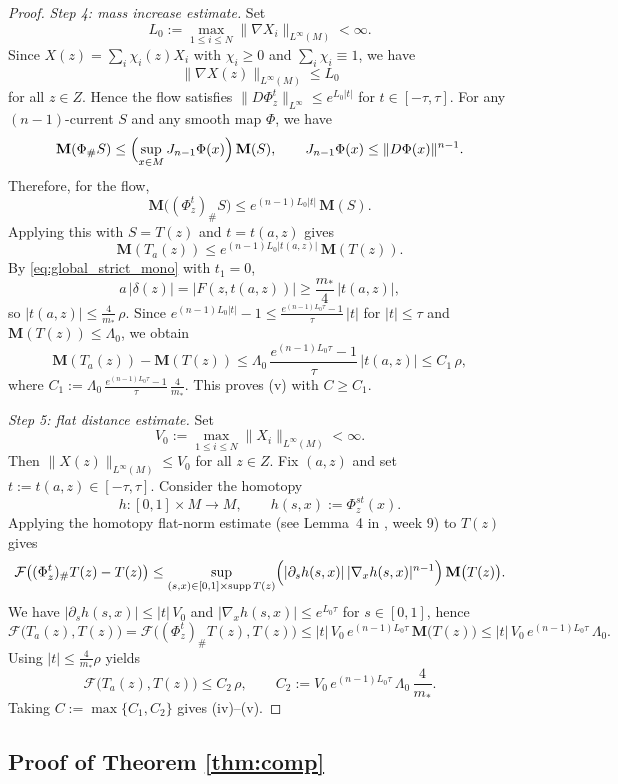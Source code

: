 \documentclass[12pt,english]{article}
\theoremstyle{definition}
\begin{document}
\begin{proof}
\smallskip
\noindent\emph{Step 4: mass increase estimate.}
Set
\[
L_0:=\max_{1\le i\le N}\|\nabla X_i\|_{L^\infty(M)}<\infty.
\]
Since $X(z)=\sum_i \chi_i(z)X_i$ with $\chi_i\ge 0$ and $\sum_i\chi_i\equiv 1$, we have
\[
\|\nabla X(z)\|_{L^\infty(M)}\le L_0
\]
for all $z\in Z$. Hence the flow satisfies $\|D\Phi_z^t\|_{L^\infty}\le e^{L_0|t|}$ for $t\in[-\tau,\tau]$.
For any $(n\!-\!1)$-current $S$ and any smooth map $\Phi$, we have
\[
\mathbf M(\Phi_\# S)\le \Bigl(\sup_{x\in M} J_{n-1}\Phi(x)\Bigr)\,\mathbf M(S),
\qquad
J_{n-1}\Phi(x)\le \|D\Phi(x)\|^{n-1}.
\]
Therefore, for the flow,
\[
\mathbf M\bigl((\Phi_z^t)_\#S\bigr)\le e^{(n-1)L_0|t|}\,\mathbf M(S).
\]
Applying this with $S=T(z)$ and $t=t(a,z)$ gives
\[
\mathbf M(T_a(z))\le e^{(n-1)L_0|t(a,z)|}\,\mathbf M(T(z)).
\]
By \eqref{eq:global_strict_mono} with $t_1=0$,
\[
a\,|\delta(z)|=|F(z,t(a,z))|\ge \frac{m_\ast}{4}\,|t(a,z)|,
\]
so $|t(a,z)|\le \frac{4}{m_\ast}\,\rho$. Since $e^{(n-1)L_0|t|}-1\le \frac{e^{(n-1)L_0\tau}-1}{\tau}\,|t|$ for $|t|\le\tau$ and $\mathbf M(T(z))\le \Lambda_0$, we obtain
\[
\mathbf M(T_a(z))-\mathbf M(T(z))
\le \Lambda_0\,\frac{e^{(n-1)L_0\tau}-1}{\tau}\,|t(a,z)|
\le C_1\,\rho,
\]
where $C_1:=\Lambda_0\,\frac{e^{(n-1)L_0\tau}-1}{\tau}\,\frac{4}{m_\ast}$.
This proves (v) with $C\ge C_1$.

\smallskip
\noindent\emph{Step 5: flat distance estimate.}
Set
\[
V_0:=\max_{1\le i\le N}\|X_i\|_{L^\infty(M)}<\infty.
\]
Then $\|X(z)\|_{L^\infty(M)}\le V_0$ for all $z\in Z$.
Fix $(a,z)$ and set $t:=t(a,z)\in[-\tau,\tau]$. Consider the homotopy
\[
h:[0,1]\times M\to M,\qquad h(s,x):=\Phi_z^{s t}(x).
\]
Applying the homotopy flat-norm estimate (see Lemma~4 in \cite{Jerrard}, week 9) to $T(z)$ gives
\[
\mathcal F\bigl((\Phi_z^{t})_\#T(z)-T(z)\bigr)
\le \sup_{(s,x)\in[0,1]\times\operatorname{supp} T(z)}
\Bigl(|\partial_s h(s,x)|\,|\nabla_x h(s,x)|^{n-1}\Bigr)\,\mathbf M\bigl(T(z)\bigr).
\]
We have $|\partial_s h(s,x)|\le |t|\,V_0$ and $|\nabla_x h(s,x)|\le e^{L_0\tau}$ for $s\in[0,1]$, hence
\[
\mathcal F\bigl(T_a(z),T(z)\bigr)
=\mathcal F\bigl((\Phi_z^{t})_\#T(z),T(z)\bigr)
\le |t|\,V_0\,e^{(n-1)L_0\tau}\,\mathbf M\bigl(T(z)\bigr)
\le |t|\,V_0\,e^{(n-1)L_0\tau}\,\Lambda_0.
\]
Using $|t|\le \frac{4}{m_\ast}\rho$ yields
\[
\mathcal F\bigl(T_a(z),T(z)\bigr)\le C_2\,\rho,
\qquad
C_2:=V_0\,e^{(n-1)L_0\tau}\,\Lambda_0\,\frac{4}{m_\ast}.
\]
Taking $C:=\max\{C_1,C_2\}$ gives (iv)--(v).
\end{proof}

\subsection{Proof of Theorem \ref{thm:comp}}
\end{document}
